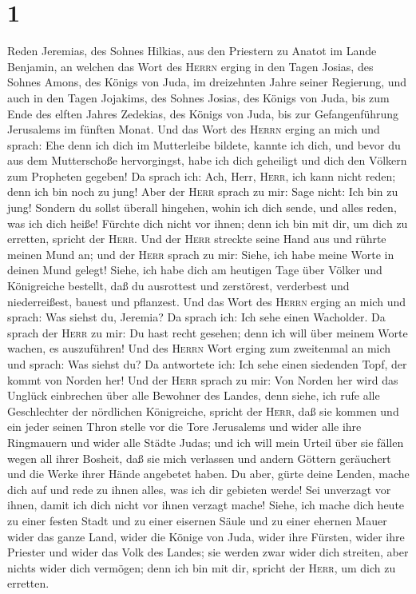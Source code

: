 \hypertarget{section}{%
\section{1}\label{section}}

 Reden Jeremias, des Sohnes Hilkias, aus den Priestern zu
Anatot im Lande Benjamin,  an welchen das Wort des
\textsc{Herrn} erging in den Tagen Josias, des Sohnes Amons, des Königs
von Juda, im dreizehnten Jahre seiner Regierung,  und auch
in den Tagen Jojakims, des Sohnes Josias, des Königs von Juda, bis zum
Ende des elften Jahres Zedekias, des Königs von Juda, bis zur
Gefangenführung Jerusalems im fünften Monat.  Und das Wort
des \textsc{Herrn} erging an mich und sprach:  Ehe denn
ich dich im Mutterleibe bildete, kannte ich dich, und bevor du aus dem
Mutterschoße hervorgingst, habe ich dich geheiligt und dich den Völkern
zum Propheten gegeben!  Da sprach ich: Ach, Herr,
\textsc{Herr}, ich kann nicht reden; denn ich bin noch zu jung!
 Aber der \textsc{Herr} sprach zu mir: Sage nicht: Ich bin
zu jung! Sondern du sollst überall hingehen, wohin ich dich sende, und
alles reden, was ich dich heiße!  Fürchte dich nicht vor
ihnen; denn ich bin mit dir, um dich zu erretten, spricht der
\textsc{Herr}.  Und der \textsc{Herr} streckte seine Hand
aus und rührte meinen Mund an; und der \textsc{Herr} sprach zu mir:
Siehe, ich habe meine Worte in deinen Mund gelegt! 
Siehe, ich habe dich am heutigen Tage über Völker und Königreiche
bestellt, daß du ausrottest und zerstörest, verderbest und
niederreißest, bauest und pflanzest.  Und das Wort des
\textsc{Herrn} erging an mich und sprach: Was siehst du, Jeremia? Da
sprach ich: Ich sehe einen Wacholder.  Da sprach der
\textsc{Herr} zu mir: Du hast recht gesehen; denn ich will über meinem
Worte wachen, es auszuführen!  Und des \textsc{Herrn}
Wort erging zum zweitenmal an mich und sprach: Was siehst du? Da
antwortete ich: Ich sehe einen siedenden Topf, der kommt von Norden her!
 Und der \textsc{Herr} sprach zu mir: Von Norden her wird
das Unglück einbrechen über alle Bewohner des Landes, 
denn siehe, ich rufe alle Geschlechter der nördlichen Königreiche,
spricht der \textsc{Herr}, daß sie kommen und ein jeder seinen Thron
stelle vor die Tore Jerusalems und wider alle ihre Ringmauern und wider
alle Städte Judas;  und ich will mein Urteil über sie
fällen wegen all ihrer Bosheit, daß sie mich verlassen und andern
Göttern geräuchert und die Werke ihrer Hände angebetet haben.
 Du aber, gürte deine Lenden, mache dich auf und rede zu
ihnen alles, was ich dir gebieten werde! Sei unverzagt vor ihnen, damit
ich dich nicht vor ihnen verzagt mache!  Siehe, ich mache
dich heute zu einer festen Stadt und zu einer eisernen Säule und zu
einer ehernen Mauer wider das ganze Land, wider die Könige von Juda,
wider ihre Fürsten, wider ihre Priester und wider das Volk des Landes;
 sie werden zwar wider dich streiten, aber nichts wider
dich vermögen; denn ich bin mit dir, spricht der \textsc{Herr}, um dich
zu erretten.

